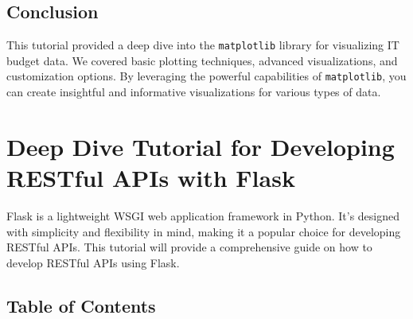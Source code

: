 \documentclass[
  letterpaper,
  DIV=11,
  numbers=noendperiod]{scrreprt}
\newenvironment{Shaded}{\begin{snugshade}}{\end{snugshade}}
\newcommand{\DecValTok}[1]{\textcolor[rgb]{0.68,0.00,0.00}{#1}}
\newcommand{\NormalTok}[1]{\textcolor[rgb]{0.00,0.23,0.31}{#1}}
\newcommand{\OperatorTok}[1]{\textcolor[rgb]{0.37,0.37,0.37}{#1}}
\newcommand{\StringTok}[1]{\textcolor[rgb]{0.13,0.47,0.30}{#1}}
\begin{document}
\begin{Shaded}
\end{Shaded}

\section{Conclusion}\label{conclusion-53}

This tutorial provided a deep dive into the \texttt{matplotlib} library
for visualizing IT budget data. We covered basic plotting techniques,
advanced visualizations, and customization options. By leveraging the
powerful capabilities of \texttt{matplotlib}, you can create insightful
and informative visualizations for various types of data.


\chapter{Deep Dive Tutorial for Developing RESTful APIs with
Flask}\label{deep-dive-tutorial-for-developing-restful-apis-with-flask}

Flask is a lightweight WSGI web application framework in Python. It's
designed with simplicity and flexibility in mind, making it a popular
choice for developing RESTful APIs. This tutorial will provide a
comprehensive guide on how to develop RESTful APIs using Flask.

\section{Table of Contents}\label{table-of-contents-24}
\end{document}
